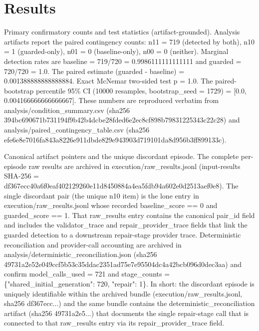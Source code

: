 \documentclass[conference]{IEEEtran}
\begin{document}
\section{Results}
Primary confirmatory counts and test statistics (artifact-grounded). Analysis artifacts report the paired contingency counts: n11 = 719 (detected by both), n10 = 1 (guarded-only), n01 = 0 (baseline-only), n00 = 0 (neither). Marginal detection rates are baseline = 719/720 = 0.9986111111111111 and guarded = 720/720 = 1.0. The paired estimate (guarded - baseline) = 0.001388888888888884. Exact McNemar two-sided test p = 1.0. The paired-bootstrap percentile 95\% CI (10000 resamples, bootstrap\_seed = 1729) = [0.0, 0.004166666666666667]. These numbers are reproduced verbatim from analysis/condition\_summary.csv (sha256 394bc690\allowbreak{}671b7311\allowbreak{}94f9b42b\allowbreak{}4dcbe28f\allowbreak{}ded6e2ec\allowbreak{}8cf898b7\allowbreak{}98312253\allowbreak{}43c22c28) and analysis/paired\_contingency\_table.csv (sha256 efe6e8e7\allowbreak{}016fa843\allowbreak{}a8226e91\allowbreak{}1dbde829\allowbreak{}e943903d\allowbreak{}719101da\allowbreak{}8d956b3f\allowbreak{}f899133c).

Canonical artifact pointers and the unique discordant episode. The complete per-episode raw results are archived in execution/raw\_results.jsonl (input-results SHA-256 = df367ecc\allowbreak{}40a6f0ea\allowbreak{}f4021292\allowbreak{}60e11d84\allowbreak{}50884a4e\allowbreak{}a5fdb94a\allowbreak{}602e0d25\allowbreak{}13aef0e8). The single discordant pair (the unique n10 item) is the lone entry in execution/raw\_results.jsonl whose recorded baseline\_score == 0 and guarded\_score == 1. That raw\_results entry contains the canonical pair\_id field and includes the validator\_trace and repair\_provider\_trace fields that link the guarded detection to a downstream repair-stage provider trace. Deterministic reconciliation and provider-call accounting are archived in analysis/deterministic\_reconciliation.json (sha256 49731a2e\allowbreak{}52e049cc\allowbreak{}f5b53c35\allowbreak{}ddac2351\allowbreak{}ad75e7e9\allowbreak{}5504dc4a\allowbreak{}42bcb096\allowbreak{}d0dec3aa) and confirm model\_calls\_used = 721 and stage\_counts = \{"shared\_initial\_generation": 720, "repair": 1\}. In short: the discordant episode is uniquely identifiable within the archived bundle (execution/raw\_results.jsonl, sha256 df367ecc...) and the same bundle contains the deterministic\_reconciliation artifact (sha256 49731a2e5...) that documents the single repair-stage call that is connected to that raw\_results entry via its repair\_provider\_trace field.
\end{document}
